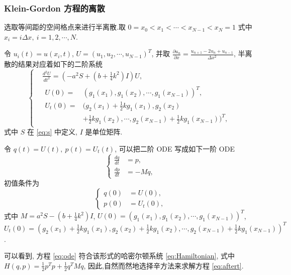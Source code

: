 \subsubsection{Klein-Gordon 方程的离散}
选取等间距的空间格点来进行半离散.取 $0=x_0<x_1<\cdots<x_{N-1}<x_N=1$ 式中 $x_i=i\Delta x,~i = 1,2,\cdots,N$.

令 $u_i(t)=u(x_i,t)$, $U=(u_1,u_2,\cdots,u_{N-1})^T$, 并取 $\frac{\partial u_n}{\partial
x}=\frac{u_{n+1}-2u_n+u_{n-1}}{\Delta x^2}$, 半离散的结果对应着如下的二阶系统
\begin{equation}\label{eq:aftert}
\left\lbrace
\begin{aligned}
&\frac{d^2U}{dt^2}=(-a^2 S+(b+\frac{1}{4}k^2)I) U,\\
&\begin{aligned}
U(0)=&(g_1(x_1),g_1(x_2),\cdots,g_1(x_{N-1}))^T,\\
U_t(0)=&(g_2(x_1)+\frac{1}{2}kg_1(x_1),g_2(x_2)\\
    &+\frac{1}{2}kg_1(x_2),\cdots,g_2(x_{N-1})+\frac{1}{2}kg_1(x_{N-1}))^T,
\end{aligned}
\end{aligned}
\right.
\end{equation}
式中
$S$ 在 \eqref{eq:s} 中定义, $I$ 是单位矩阵.

令 $q(t)=U(t),~ p(t)=U_t(t)$, 可以把二阶 ODE 写成如下一阶 ODE
\begin{equation}\label{eq:ode}
\left\lbrace
\begin{aligned}
\frac{dq}{dt}&=p,\\
\frac{dp}{dt}&=-Mq,
\end{aligned}
\right.
\end{equation}
初值条件为
\begin{equation*}
\left\lbrace
\begin{aligned}
q(0)&=U(0),\\
p(0)&=U_t(0),
\end{aligned}
\right.
\end{equation*}
式中 $M=a^2 S-(b+\frac{1}{4}k^2)I$,
$U(0)=(g_1(x_1),g_1(x_2),\cdots,g_1(x_{N-1}))^T$,
$U_t(0)=(g_2(x_1)+\frac{1}{2}kg_1(x_1),g_2(x_2)+\frac{1}{2}kg_1(x_2),\cdots,g_2(x_{N-1})+\frac{1}{2}kg_1(x_{N-1}))^T$.

可以看到, 方程 \eqref{eq:ode} 符合该形式的哈密尔顿系统 \eqref{eq:Hamiltonian}, 式中
$H(q,p)=\frac{1}{2}p^Tp+\frac{1}{2}q^TMq$, 因此,自然而然地选择辛方法来求解方程 \eqref{eq:aftert}.

